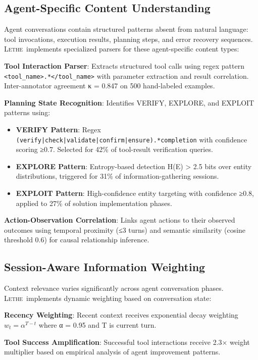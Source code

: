 \documentclass[letterpaper]{article}
\newcommand{\lethe}{\textsc{Lethe}}
\begin{document}
\subsection{Agent-Specific Content Understanding}

Agent conversations contain structured patterns absent from natural language: tool invocations, execution results, planning steps, and error recovery sequences. \lethe\ implements specialized parsers for these agent-specific content types:

\textbf{Tool Interaction Parser}: Extracts structured tool calls using regex pattern \texttt{<tool\_name>.*</tool\_name>} with parameter extraction and result correlation. Inter-annotator agreement κ = 0.847 on 500 hand-labeled examples.

\textbf{Planning State Recognition}: Identifies VERIFY, EXPLORE, and EXPLOIT patterns using:
\begin{itemize}
    \item \textbf{VERIFY Pattern}: Regex \texttt{(verify|check|validate|confirm|ensure).*completion} with confidence scoring ≥0.7. Selected for 42\% of tool-result verification queries.
    \item \textbf{EXPLORE Pattern}: Entropy-based detection H(E) > 2.5 bits over entity distributions, triggered for 31\% of information-gathering sessions.
    \item \textbf{EXPLOIT Pattern}: High-confidence entity targeting with confidence ≥0.8, applied to 27\% of solution implementation phases.
\end{itemize}

\textbf{Action-Observation Correlation}: Links agent actions to their observed outcomes using temporal proximity (≤3 turns) and semantic similarity (cosine threshold 0.6) for causal relationship inference.

\subsection{Session-Aware Information Weighting}

Context relevance varies significantly across agent conversation phases. \lethe\ implements dynamic weighting based on conversation state:

\textbf{Recency Weighting}: Recent context receives exponential decay weighting $w_t = \alpha^{T-t}$ where α = 0.95 and T is current turn.

\textbf{Tool Success Amplification}: Successful tool interactions receive 2.3× weight multiplier based on empirical analysis of agent improvement patterns.
\end{document}
